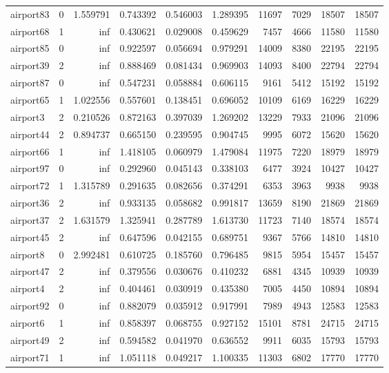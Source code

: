 \begin{longtable}{|l|r|r|r|r|r|r|r|r|r|}
airport83 & 0 & 1.559791 & 0.743392 & 0.546003 & 1.289395 & 11697 & 7029 & 18507 & 18507 \\
airport68 & 1 & inf & 0.430621 & 0.029008 & 0.459629 & 7457 & 4666 & 11580 & 11580 \\
airport85 & 0 & inf & 0.922597 & 0.056694 & 0.979291 & 14009 & 8380 & 22195 & 22195 \\
airport39 & 2 & inf & 0.888469 & 0.081434 & 0.969903 & 14093 & 8400 & 22794 & 22794 \\
airport87 & 0 & inf & 0.547231 & 0.058884 & 0.606115 & 9161 & 5412 & 15192 & 15192 \\
airport65 & 1 & 1.022556 & 0.557601 & 0.138451 & 0.696052 & 10109 & 6169 & 16229 & 16229 \\
airport3 & 2 & 0.210526 & 0.872163 & 0.397039 & 1.269202 & 13229 & 7933 & 21096 & 21096 \\
airport44 & 2 & 0.894737 & 0.665150 & 0.239595 & 0.904745 & 9995 & 6072 & 15620 & 15620 \\
airport66 & 1 & inf & 1.418105 & 0.060979 & 1.479084 & 11975 & 7220 & 18979 & 18979 \\
airport97 & 0 & inf & 0.292960 & 0.045143 & 0.338103 & 6477 & 3924 & 10427 & 10427 \\
airport72 & 1 & 1.315789 & 0.291635 & 0.082656 & 0.374291 & 6353 & 3963 & 9938 & 9938 \\
airport36 & 2 & inf & 0.933135 & 0.058682 & 0.991817 & 13659 & 8190 & 21869 & 21869 \\
airport37 & 2 & 1.631579 & 1.325941 & 0.287789 & 1.613730 & 11723 & 7140 & 18574 & 18574 \\
airport45 & 2 & inf & 0.647596 & 0.042155 & 0.689751 & 9367 & 5766 & 14810 & 14810 \\
airport8 & 0 & 2.992481 & 0.610725 & 0.185760 & 0.796485 & 9815 & 5954 & 15457 & 15457 \\
airport47 & 2 & inf & 0.379556 & 0.030676 & 0.410232 & 6881 & 4345 & 10939 & 10939 \\
airport4 & 2 & inf & 0.404461 & 0.030919 & 0.435380 & 7005 & 4450 & 10894 & 10894 \\
airport92 & 0 & inf & 0.882079 & 0.035912 & 0.917991 & 7989 & 4943 & 12583 & 12583 \\
airport6 & 1 & inf & 0.858397 & 0.068755 & 0.927152 & 15101 & 8781 & 24715 & 24715 \\
airport49 & 2 & inf & 0.594582 & 0.041970 & 0.636552 & 9911 & 6035 & 15793 & 15793 \\
airport71 & 1 & inf & 1.051118 & 0.049217 & 1.100335 & 11303 & 6802 & 17770 & 17770 \\

\end{longtable}
